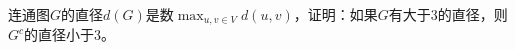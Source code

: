 \begin{Exercise}
  连通图$G$的直径$d(G)$是数$\max_{u,v\in V}d(u,v)$，证明：如果$G$有大于$3$的直径，则$G^c$的直径小于$3$。
\end{Exercise}
